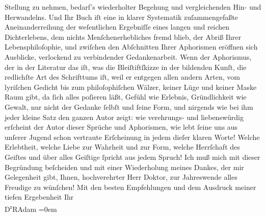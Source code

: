                     Stellung zu nehmen, bedarf’s wiederholter Begehung und vergleichenden Hin- und
                    Herwandelns. Und Ihr Buch iſt eine in klarer Systematik zuſammengefaßte
                    Aneinanderreihung der weſentlichen Ergebniſſe eines langen und reichen
                    Dichterlebens, dem nichts Menſchenerhebliches fremd blieb, der Abriß Ihrer
                    Lebensphiloſophie, und zwiſchen den Abſchnitten Ihrer Aphorismen eröffnen sich
                    Ausblicke, verlockend zu verbindender Gedankenarbeit. Wenn der Aphorismus, der
                    in der Literatur das iſt, was die Bleiſtiftſkizze in der bildenden Kunſt, die
                    redlichſte Art des Schrifttums iſt, weil er entgegen allen andern Arten, vom
                    lyriſchen Gedicht bis zum philoſophiſchen Wälzer, keiner Lüge und keiner Maske
                    Raum  gibt, {\pb}da ſich alles poſieren läßt, Gefühl
                    wie Erlebnis, Gründlichkeit wie Gewalt, nur nicht der Gedanke ſelbſt und ſeine
                    Form, und nirgends wie bei ihm jeder kleine Satz den ganzen Autor zeigt: wie
                    verehrungs- und liebenswürdig erſcheint der Autor dieser Sprüche und Aphorismen,
                    wie lebt ſeine uns aus unſerer Jugend schon vertraute Erſcheinung in jedem
                    dieſer klaren Worte! Welche Erlebtheit, welche Liebe zur Wahrheit und zur Form,
                    welche Herrſchaft des Geiſtes und über alles Geiſtige ſpricht aus jedem
                    Spruch!\pend
           \pstart
           Ich muß mich mit dieser Begründung beſcheiden und mit einer Wiederholung meines
                    Dankes, der mir Gelegenheit gibt, Ihnen, hochverehrter Herr Doktor, zur
                    Jahreswende alles Freudige zu wünſchen!\pend
           \pstart
           Mit den besten Empfehlungen und {\pb}dem
                    Ausdruck meiner tiefen Ergebenheit\pend
           \pstart
           Ihr{\\[\baselineskip]}\spacefill\mbox{D\textsuperscript{r}RAdam}\pend
           \leftskip=0em{}\endnumbering{}  
      